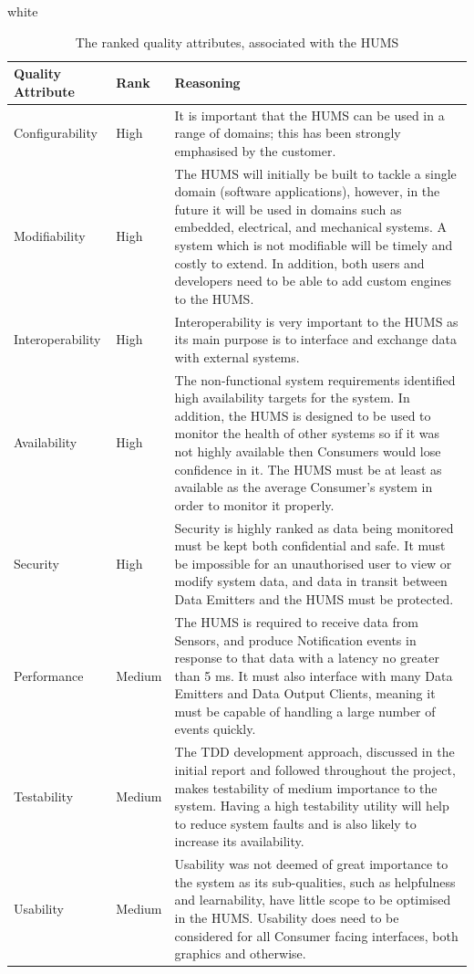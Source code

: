 \documentclass[10pt,a4paper]{article}
\newcommand{\xtableformat}[4]{
\begin{table}[ht!]
\centering
  \rowcolors{2}{gray!10} {white}
\begin{tabularx}{\textwidth}{#1}
  \hline
  \rowcolor[gray]{0.9} #2
  \hline
\end{tabularx}
\caption{#3}
\label{#4}
\end{table}}
\begin{document}
\xtableformat{p{2.4cm} p{1.2cm} X}{
\hline
Quality \qquad Attribute & Rank & Reasoning \\
\hline
Configurability & High & It is important that the HUMS can be used in a range of domains; this has been strongly emphasised by the customer. 
\\
Modifiability & High & The HUMS will initially be built to tackle a single domain (software applications), however, in the future it will be used in domains such as embedded, electrical, and mechanical systems. A system which is not modifiable will be timely and costly to extend. In addition, both users and developers need to be able to add custom engines to the HUMS.
\\
Interoperability & High & Interoperability is very important to the HUMS as its main purpose is to interface and exchange data with external systems. 
\\
Availability & High & The non-functional system requirements identified high availability targets for the system. In addition, the HUMS is designed to be used to monitor the health of other systems so if it was not highly available then Consumers would lose confidence in it. The HUMS must be at least as available as the average Consumer's system in order to monitor it properly. 
\\
Security & High & Security is highly ranked as data being monitored must be kept both confidential and safe. It must be impossible for an unauthorised user to view or modify system data, and data in transit between Data Emitters and the HUMS must be protected.
\\
Performance & Medium & The HUMS is required to receive data from Sensors, and produce Notification events in response to that data with a latency no greater than 5 ms. It must also interface with many Data Emitters and Data Output Clients, meaning it must be capable of handling a large number of events quickly.
\\
Testability & Medium & The TDD development approach, discussed in the initial report and followed throughout the project, makes testability of medium importance to the system. Having a high testability utility will help to reduce system faults and is also likely to increase its availability. 
\\
Usability & Medium & Usability was not deemed of great importance to the system as its sub-qualities, such as helpfulness and learnability, have little scope to be optimised in the HUMS. Usability does need to be considered for all Consumer facing interfaces, both graphics and otherwise.
\\
}{The ranked quality attributes, associated with the HUMS}{tab:qualities}
\end{document}
